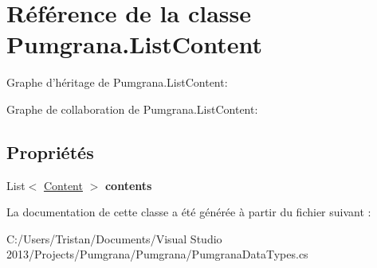 \hypertarget{class_pumgrana_1_1_list_content}{\section{Référence de la classe Pumgrana.\+List\+Content}
\label{class_pumgrana_1_1_list_content}
}


Graphe d'héritage de Pumgrana.\+List\+Content\+:


Graphe de collaboration de Pumgrana.\+List\+Content\+:
\subsection*{Propriétés}
\begin{DoxyCompactItemize}
\item 
\hypertarget{class_pumgrana_1_1_list_content_a6f5e4fe5c2f73ef9813d4acc23618c13}{List$<$ \hyperlink{class_pumgrana_1_1_content}{Content} $>$ {\bfseries contents}}\label{class_pumgrana_1_1_list_content_a6f5e4fe5c2f73ef9813d4acc23618c13}

\end{DoxyCompactItemize}


La documentation de cette classe a été générée à partir du fichier suivant \+:\begin{DoxyCompactItemize}
\item 
C\+:/\+Users/\+Tristan/\+Documents/\+Visual Studio 2013/\+Projects/\+Pumgrana/\+Pumgrana/Pumgrana\+Data\+Types.\+cs\end{DoxyCompactItemize}

